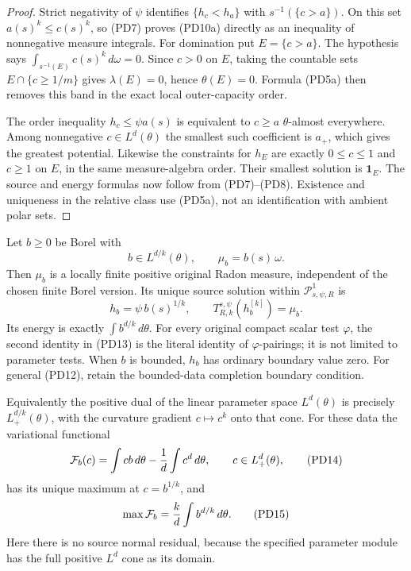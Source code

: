 \begin{proof}
Strict negativity of $\psi$ identifies
$\{h_c<h_a\}$ with $s^{-1}(\{c>a\})$. On this set
$a(s)^k\leq c(s)^k$, so (PD7) proves (PD10a) directly
as an inequality of nonnegative measure integrals.
For domination put $E=\{c>a\}$. The hypothesis says
$\int_{s^{-1}(E)}c(s)^k\,d\omega=0$.
Since $c>0$ on $E$, taking the countable sets $E\cap\{c\geq1/m\}$
gives $\lambda(E)=0$, hence $\theta(E)=0$. Formula (PD5a)
then removes this band in the exact local outer-capacity order.

The order inequality $h_c\leq\psi a(s)$ is equivalent to
$c\geq a$ $\theta$-almost everywhere. Among nonnegative
$c\in L^d(\theta)$ the smallest such coefficient is $a_+$,
which gives the greatest potential. Likewise the constraints
for $h_E$ are exactly $0\leq c\leq1$ and $c\geq1$ on $E$,
in the same measure-algebra order. Their smallest solution is
$\mathbf1_E$. The source and energy formulas now follow from
(PD7)--(PD8). Existence and uniqueness in the relative class
use (PD5a), not an identification with ambient polar sets.
\end{proof}

\begin{theorem}
\label{thm:r12-parameter-Dirichlet}
Let $b\geq0$ be Borel with
\[
                             b\in L^{d/k}(\theta),
 \qquad \mu_b=b(s)\,\omega.
 \tag{PD12}
\]
Then $\mu_b$ is a locally finite positive original Radon
measure, independent of the chosen finite Borel version.
Its unique source solution within
$\mathscr P^1_{s,\psi,R}$ is
\[
                         h_b=\psi\,b(s)^{1/k},\qquad
                  T^{s,\psi}_{R,k}(h_b^{[k]})=\mu_b.
 \tag{PD13}
\]
Its energy is exactly $\int b^{d/k}\,d\theta$.
For every original compact scalar test $\varphi$,
the second identity in (PD13) is the literal identity
of $\varphi$-pairings; it is not limited to parameter
tests. When $b$ is bounded, $h_b$ has ordinary boundary
value zero. For general (PD12), retain the bounded-data
completion boundary condition.

Equivalently the positive dual of the linear parameter
space $L^d(\theta)$ is precisely $L^{d/k}_+(\theta)$,
with the curvature gradient $c\mapsto c^k$ onto that
cone. For these data the variational functional
\[
             \mathcal F_b(c)=\int cb\,d\theta
                                  -{1\over d}\int c^d\,d\theta,
                         \qquad c\in L^d_+(\theta),
 \tag{PD14}
\]
has its unique maximum at $c=b^{1/k}$, and
\[
                    \max\mathcal F_b={k\over d}\int b^{d/k}\,d\theta.
 \tag{PD15}
\]
Here there is no source normal residual, because the
specified parameter module has the full positive
$L^d$ cone as its domain.
\end{theorem}

